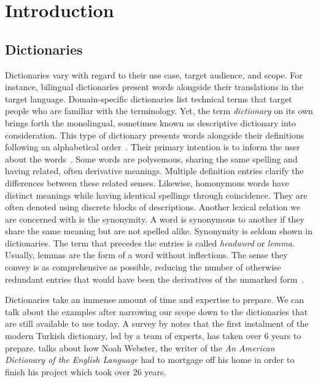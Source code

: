\chapter{Introduction}\label{chap:introduction}%
\section{Dictionaries}%
\label{sec:dictionaries}
Dictionaries vary with regard to their use case, target audience, and scope.
For instance, bilingual dictionaries present words alongside their translations in the target language.
Domain-specific dictionaries list technical terms that target people who are familiar with the terminology.
Yet, the term \emph{dictionary} on its own brings forth the monolingual, sometimes known as descriptive dictionary into consideration.
This type of dictionary presents words alongside their definitions following an alphabetical order~\cite{sterkenburg_practical_2003}.
Their primary intention is to inform the user about the words~\cite{uzun_modern_2005}.
Some words are polysemous, sharing the same spelling and having related, often derivative meanings.
Multiple definition entries clarify the differences between these related senses.
Likewise, homonymous words have distinct meanings while having identical spellings through coincidence.
They are often denoted using discrete blocks of descriptions.
Another lexical relation we are concerned with is the synonymity.
A word is synonymous to another if they share the same meaning but are not spelled alike.
Synonymity is seldom shown in dictionaries.
The term that precedes the entries is called \emph{headword} or \emph{lemma}.
Usually, lemmas are the form of a word without inflections.
The sense they convey is as comprehensive as possible, reducing the number of otherwise redundant entries that would have been the derivatives of the unmarked form~\cite{ibrahim_usta_turkce_2006}.

Dictionaries take an immense amount of time and expertise to prepare.
We can talk about the examples after narrowing our scope down to the dictionaries that are still available to use today.
A survey by \textcite{uzun_1945ten_1999} notes that the first instalment of the modern Turkish dictionary, led by a team of experts, has taken over 6 years to prepare.
\textcite{kendall_forgotten_2011} talks about how Noah Webster, the writer of the \emph{An American Dictionary of the English Language} had to mortgage off his home in order to finish his project which took over 26 years.

